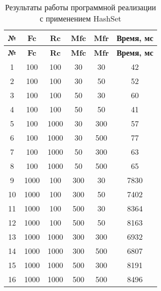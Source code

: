 \begin{longtable}{|c|c|c|c|c|c|}
    \caption{Результаты работы программной реализации с применением HashSet}
    \label{tab:hashset}\\   
    \hline
    \bfseries{№} & \bfseries{Fc} & \bfseries{Rc} & \bfseries{Mfc} & \bfseries{Mfr} & \bfseries{Время, мс} \\
    \hline
    \endfirsthead
    \hline
    \bfseries{№} & \bfseries{Fc} & \bfseries{Rc} & \bfseries{Mfc} & \bfseries{Mfr} & \bfseries{Время, мс} \\
    \hline
    \endhead
    \hline
    1 & 100 & 100 & 30 & 30 & 42 \\
    \hline
    2 & 100 & 100 & 30 & 50 & 52 \\
    \hline
    3 & 100 & 100 & 50 & 30 & 60 \\
    \hline
    4 & 100 & 100 & 50 & 50 & 41 \\
    \hline
    5 & 100 & 1000 & 30 & 300 & 57 \\
    \hline
    6 & 100 & 1000 & 30 & 500 & 77 \\
    \hline
    7 & 100 & 1000 & 50 & 300 & 63 \\
    \hline
    8 & 100 & 1000 & 50 & 500 & 65 \\
    \hline
    9 & 1000 & 100 & 300 & 30 & 7830 \\
    \hline
    10 & 1000 & 100 & 300 & 50 & 7402 \\
    \hline
    11 & 1000 & 100 & 500 & 30 & 8364 \\
    \hline
    12 & 1000 & 100 & 500 & 50 & 8163 \\
    \hline
    13 & 1000 & 1000 & 300 & 300 & 6932 \\
    \hline
    14 & 1000 & 1000 & 300 & 500 & 6807 \\
    \hline
    15 & 1000 & 1000 & 500 & 300 & 8191 \\
    \hline
    16 & 1000 & 1000 & 500 & 500 & 8496 \\
    \hline
\end{longtable}

